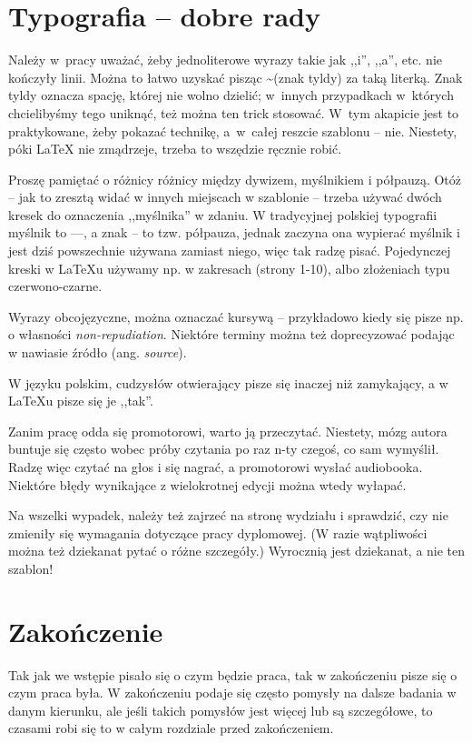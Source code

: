 \documentclass[12pt,a4paper,leqno,oneside,titlepage]{book}
\begin{document}
\chapter{Typografia -- dobre rady}

Należy w~pracy uważać, żeby jednoliterowe wyrazy takie jak ,,i'', ,,a'', etc. nie kończyły linii. Można to łatwo uzyskać pisząc \textasciitilde (znak tyldy) za taką literką. Znak tyldy oznacza spację, której nie wolno dzielić; w~innych przypadkach w~których chcielibyśmy tego uniknąć, też można ten trick stosować. W~tym akapicie jest to praktykowane, żeby pokazać technikę, a~w~całej reszcie szablonu -- nie. Niestety, póki \LaTeX{} nie zmądrzeje, trzeba to wszędzie ręcznie robić.

Proszę pamiętać o różnicy różnicy między dywizem, myślnikiem i półpauzą. Otóż -- jak to zresztą widać w innych miejscach w szablonie -- trzeba używać dwóch kresek do oznaczenia ,,myślnika'' w zdaniu. W tradycyjnej polskiej typografii myślnik to ---, a znak -- to tzw. półpauza, jednak zaczyna ona wypierać myślnik i jest dziś powszechnie używana zamiast niego, więc tak radzę pisać. Pojedynczej kreski w \LaTeX{}u używamy np. w zakresach (strony 1-10), albo złożeniach typu czerwono-czarne.

Wyrazy obcojęzyczne, można oznaczać kursywą -- przykładowo kiedy się pisze np. o własności \textit{non-repudiation}. Niektóre terminy można też doprecyzować podając w nawiasie źródło (ang. \textit{source}).

W języku polskim, cudzysłów otwierający pisze się inaczej niż zamykający, a w \LaTeX{}u pisze się je ,,tak''.

Zanim pracę odda się promotorowi, warto ją przeczytać. Niestety, mózg autora buntuje się często wobec próby czytania po raz n-ty czegoś, co sam wymyślił. Radzę więc czytać na głos i się nagrać, a promotorowi wysłać audiobooka. Niektóre błędy wynikające z wielokrotnej edycji można wtedy wyłapać.

Na wszelki wypadek, należy też zajrzeć na stronę wydziału \cite{WMIdyplom} i sprawdzić, czy nie zmieniły się wymagania dotyczące pracy dyplomowej. (W razie wątpliwości można też dziekanat pytać o różne szczegóły.) Wyrocznią jest dziekanat, a nie ten szablon!

\chapter*{Zakończenie}

Tak jak we wstępie pisało się o czym będzie praca, tak w zakończeniu pisze się o czym praca była. W zakończeniu podaje się często pomysły na dalsze badania w danym kierunku, ale jeśli takich pomysłów jest więcej lub są szczegółowe, to czasami robi się to w całym rozdziale przed zakończeniem.
\end{document}
